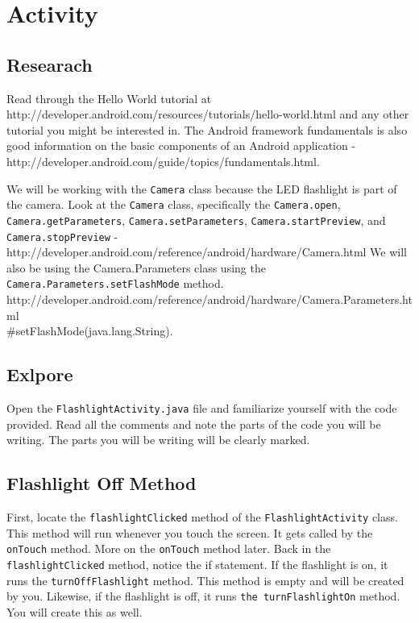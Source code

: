 \section{Activity}

\subsection{Researach}
Read through the Hello World tutorial at http://developer.android.com/resources/tutorials/hello-world.html and any other tutorial you might be interested in.
The Android framework fundamentals is also good information on the basic components of an Android application - http://developer.android.com/guide/topics/fundamentals.html. 

We will be working with the \verb=Camera= class because the LED flashlight is part of the camera.
Look at the \verb=Camera= class, specifically the \verb=Camera.open=, \verb=Camera.getParameters=, \verb=Camera.setParameters=, \verb=Camera.startPreview=, and \verb=Camera.stopPreview= - http://developer.android.com/reference/android/hardware/Camera.html
We will also be using the Camera.Parameters class using the \verb=Camera.Parameters.setFlashMode= method. http://developer.android.com/reference/android/hardware/Camera.Parameters.html \\ \#setFlashMode(java.lang.String).  

\subsection{Exlpore}
Open the \verb=FlashlightActivity.java= file and familiarize yourself with the code provided.
Read all the comments and note the parts of the code you will be writing.
The parts you will be writing will be clearly marked.
\subsection{Flashlight Off Method}
First, locate the \verb=flashlightClicked= method of the \verb=FlashlightActivity= class.
This method will run whenever you touch the screen.
It gets called by the \verb=onTouch= method.
More on the \verb=onTouch= method later.
Back in the \verb=flashlightClicked= method, notice the if statement.
If the flashlight is on, it runs the \verb=turnOffFlashlight= method.
This method is empty and will be created by you.
Likewise, if the flashlight is off, it runs \verb=the turnFlashlightOn= method.
You will create this as well.

